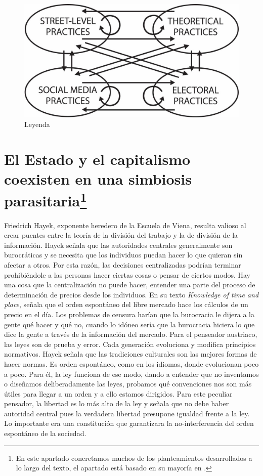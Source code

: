 \begin{figure}[htb]
  \centering
  \includegraphics[width=0.7\linewidth]{images/spheres-practices.png}
  \caption{Leyenda}
  \label{fig:spehres}
\end{figure}

\section[El Estado y el capitalismo coexisten en una simbiosis parasitaria]{El Estado y el capitalismo coexisten en una simbiosis parasitaria\footnote{En este apartado concretamos muchos de los planteamientos desarrollados a lo largo del texto, el apartado está basado en su mayoría en \autocite{PeopleArePeople2018}.}}
\label{sub:el-estado-y-el-capitalismo-coexisten-en-una-simbiosis-parasitaria}

Friedrich Hayek, exponente heredero de la Escuela de Viena, resulta valioso al crear puentes entre la teoría de la división del trabajo y la de división de la información. Hayek señala que las autoridades centrales generalmente son burocráticas y se necesita que los individuos puedan hacer lo que quieran sin afectar a otros. Por esta razón, las decisiones centralizadas podrían terminar prohibiéndole a las personas hacer ciertas cosas o pensar de ciertos modos. Hay una cosa que la centralización no puede hacer, entender una parte del proceso de determinación de precios desde los individuos. En su texto \emph{Knowledge of time and place}, señala que el orden espontáneo del libre mercado hace los cálculos de un precio en el día. Los problemas de censura harían que la burocracia le dijera a la gente qué hacer y qué no, cuando lo idóneo sería que la burocracia hiciera lo que dice la gente a través de la información del mercado. Para el penseador austriaco, las leyes son de prueba y error. Cada generación evoluciona y modifica principios normativos. Hayek señala que las tradiciones culturales son las mejores formas de hacer normas. Es orden espontáneo, como en los idiomas, donde evolucionan poco a poco. Para él, la ley funciona de ese modo, dando a entender que no inventamos o diseñamos deliberadamente las leyes, probamos qué convenciones nos son más útiles para llegar a un orden y a ello estamos dirigidos. Para este peculiar pensador, la libertad es lo más alto de la ley y señala que no debe haber autoridad central pues la verdadera libertad presupone igualdad frente a la ley. Lo importante era una constitución que garantizara la no-interferencia del orden espontáneo de la sociedad.

